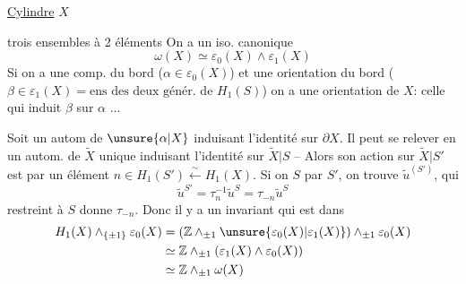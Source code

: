 \uline{Cylindre}\quad{} $X$

trois ensembles à 2 éléments
On a un iso. canonique
\[
\omega(X)\simeq\varepsilon_0(X)\wedge\varepsilon_1(X)
\]
Si on a une comp.  du bord ($\alpha\in\varepsilon_0(X)$) et une orientation du bord ($\beta\in\varepsilon_1(X)=\text{ens des deux génér. de }H_1(S)$) on a une orientation de $X$: celle qui induit $\beta$ sur $\alpha$ ...

Soit un autom  de $\unsure{\alpha|X}$ induisant l'identité sur $\partial X$. Il peut se relever en un autom. de $\widetilde X$ unique  induisant l'identité sur $\widetilde X|S$ -- Alors son action sur $\widetilde X|S'$ est   par un élément  $n\in H_1(S')\xleftarrow{\sim}H_1(X)$. Si on   $S$ par $S'$, on trouve $\widetilde u^{(S')}$, qui
\[
\widetilde u^{S'}=\tau_n^{-1}\widetilde u^S=\tau_{-n}\widetilde u^S
\]
  restreint à $S$ donne $\tau_{-n}$. Donc il y a un invariant qui est dans
\[
\begin{aligned}
H_1(X)\wedge_{\{\pm1\}}\varepsilon_0(X)
&=(\mathbb Z\wedge_{\pm1}\unsure{\varepsilon_0(X)|\varepsilon_1(X)})\wedge_{\pm1}\varepsilon_0(X)\\
&\simeq\mathbb Z\wedge_{\pm1}(\varepsilon_1(X)\wedge\varepsilon_0(X))\\
&\simeq\mathbb Z\wedge_{\pm1}\omega(X)
\end{aligned}
\]
